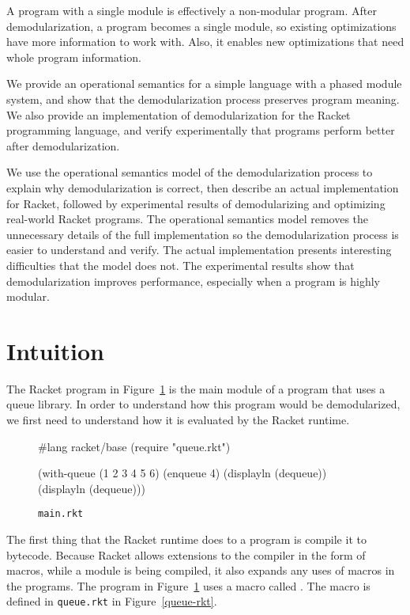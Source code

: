 \documentclass[preprint]{sigplanconf}
\begin{document}
A program with a single module is effectively a non-modular program. After demodularization, a program becomes a single module, so existing optimizations have more information to work with. Also, it enables new optimizations that need whole program information. 

We provide an operational semantics for a simple language with a phased module system, and show that the demodularization process preserves program meaning. We also provide an implementation of demodularization for the Racket programming language, and verify experimentally that programs perform better after demodularization.

We use the operational semantics model of the demodularization process to explain why demodularization is correct, then describe an actual implementation for Racket, followed by experimental results of demodularizing and optimizing real-world Racket programs. The operational semantics model removes the unnecessary details of the full implementation so the demodularization process is easier to understand and verify. The actual implementation presents interesting difficulties that the model does not. The experimental results show that demodularization improves performance, especially when a program is highly modular. 

\section{Intuition}

The Racket program in Figure~\ref{main-rkt} is the main module of a program that uses a queue library. 
In order to understand how this program would be demodularized, we first need to understand how it is evaluated by the Racket runtime.

\begin{figure}[h]
\begin{schemedisplay}
#lang racket/base
(require "queue.rkt")

(with-queue (1 2 3 4 5 6)
  (enqueue 4)
  (displayln (dequeue))
  (displayln (dequeue)))
\end{schemedisplay}
\caption{\texttt{main.rkt}}
\label{main-rkt}
\end{figure}

The first thing that the Racket runtime does to a program is compile it to bytecode. 
Because Racket allows extensions to the compiler in the form of macros, while a module is being compiled, it also expands any uses of macros in the programs.
The program in Figure~\ref{main-rkt} uses a macro called . 
The  macro is defined in \texttt{queue.rkt} in Figure~\ref{queue-rkt}.
\end{document}
